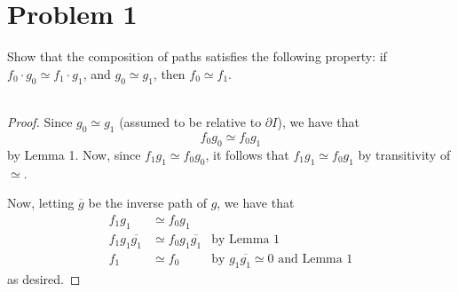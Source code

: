 \documentclass[fontsize=11pt]{scrartcl} %
\numberwithin{equation}{section} %
\numberwithin{figure}{section} %
\numberwithin{table}{section} %
\begin{document}
\section*{Problem 1}
Show that the composition of paths satisfies the following property: if 
$f_0\cdot g_0 \simeq f_1\cdot g_1$, and $g_0\simeq g_1$, then $f_0\simeq f_1$.
\\
\\
\begin{proof}
%
%

    Since $g_0\simeq g_1$ (assumed to be relative to $\partial I$), we have that
    \[
        f_0g_0\simeq f_0g_1
    \]
    by Lemma 1. Now, since $f_1g_1\simeq f_0g_0$, it follows that $f_1g_1\simeq
    f_0g_1$ by transitivity of $\simeq$.

    Now, letting $\overline{g}$ be the inverse path of $g$, we have that
    \[
        \begin{aligned}
            f_1g_1&\simeq f_0g_1\\
            f_1g_1\overline{g_1} &\simeq f_0g_1\overline{g_1} &\text{by Lemma
            1}\\
            f_1 &\simeq f_0 &\text{by $g_1\overline{g_1}\simeq 0$ and Lemma 1}
        \end{aligned}
    \]
    as desired.
\end{proof}

\newpage
\end{document}
